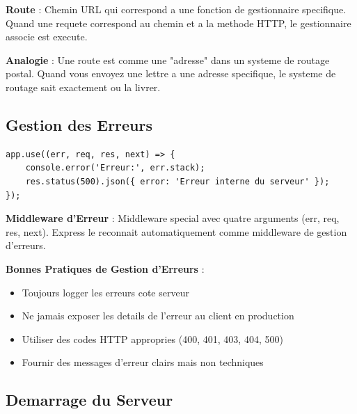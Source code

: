 \documentclass[a4paper,12pt]{book}
\begin{document}
\begin{definitionbox}
    \textbf{Route} : Chemin URL qui correspond a une fonction de gestionnaire specifique. Quand une requete correspond au chemin et a la methode HTTP, le gestionnaire associe est execute.
\end{definitionbox}

\begin{analogybox}
    \textbf{Analogie} : Une route est comme une "adresse" dans un systeme de routage postal. Quand vous envoyez une lettre a une adresse specifique, le systeme de routage sait exactement ou la livrer.
\end{analogybox}

\subsection{Gestion des Erreurs}

\begin{lstlisting}[style=javascript]
app.use((err, req, res, next) => {
    console.error('Erreur:', err.stack);
    res.status(500).json({ error: 'Erreur interne du serveur' });
});
\end{lstlisting}

\begin{definitionbox}
    \textbf{Middleware d'Erreur} : Middleware special avec quatre arguments (err, req, res, next). Express le reconnait automatiquement comme middleware de gestion d'erreurs.
\end{definitionbox}

\begin{bestpracticebox}
    \textbf{Bonnes Pratiques de Gestion d'Erreurs} :
    \begin{itemize}
        \item Toujours logger les erreurs cote serveur
        \item Ne jamais exposer les details de l'erreur au client en production
        \item Utiliser des codes HTTP appropries (400, 401, 403, 404, 500)
        \item Fournir des messages d'erreur clairs mais non techniques
    \end{itemize}
\end{bestpracticebox}

\subsection{Demarrage du Serveur}
\end{document}

